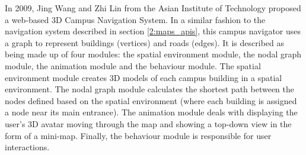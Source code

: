     In 2009, Jing Wang and Zhi Lin \cite{wang2009general} from the Asian Institute of Technology proposed a web-based 3D Campus Navigation System. In a similar fashion to the navigation system described in section \ref{2:maps_apis}, this campus navigator uses a graph to represent buildings (vertices) and roads (edges). It is described as being made up of four modules: the spatial environment module, the nodal graph module, the animation module and the behaviour module. The spatial environment module creates 3D models of each campus building in a spatial environment. The nodal graph module calculates the shortest path between the nodes defined based on the spatial environment (where each building is assigned a node near its main entrance). The animation module deals with displaying the user's 3D avatar moving through the map and showing a top-down view in the form of a mini-map. Finally, the behaviour module is responsible for user interactions.


